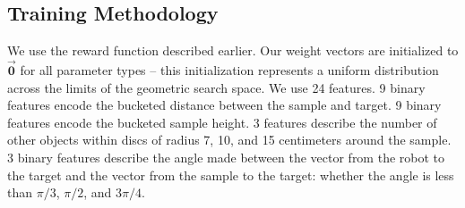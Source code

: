 \begin{table}
  \centering
  \vspace{8pt}
  \caption{Percent solved and standard deviation, along with time spent motion planning and number of calls to the motion
planner for the baseline system (B), our learned refinement policies with depth-first search through the plan refinement graph (L),
and our learned refinement policies and heuristics for searching the graph (F). Results for L and F
are averaged across 10 separately trained sets of weights. Time limit: 300s.}
  \label{table:results}
\end{table}

\subsection{Training Methodology}
We use the reward function described earlier. Our weight
vectors are initialized to $\vec{\mathbf{0}}$ for all parameter types -- this
initialization represents a uniform distribution across the limits of the geometric search space.
We use 24 features. 9 binary features encode the bucketed distance between the sample
and target. 9 binary features encode the bucketed sample height. 3 features
describe the number of other objects within discs of radius 7, 10, and 15 centimeters around the
sample. 3 binary features describe the angle made between the vector from the
robot to the target and the vector from the sample to the target: whether the angle is less than
$\pi/3$, $\pi/2$, and $3\pi/4$.

